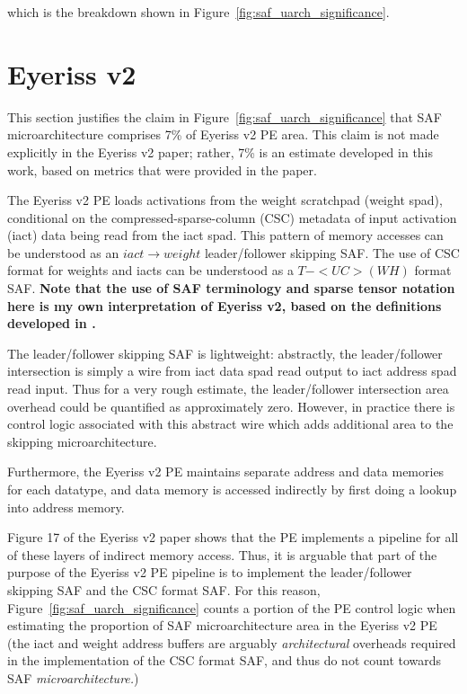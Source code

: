 which is the breakdown shown in Figure~\ref{fig:saf_uarch_significance}.

\section{Eyeriss v2\cite{eyerissv2}}

This section justifies the claim in Figure~\ref{fig:saf_uarch_significance} that SAF microarchitecture comprises 7\% of Eyeriss v2 PE area. This claim is not made explicitly in the Eyeriss v2 paper\cite{eyerissv2}; rather, 7\% is an estimate developed in this work, based on metrics that were provided in the paper.

The Eyeriss v2 PE loads activations from the weight scratchpad (weight spad), conditional on the compressed-sparse-column (CSC) metadata of input activation (iact) data being read from the iact spad\cite{eyerissv2}. This pattern of memory accesses can be understood as an $iact \rightarrow weight$ leader/follower skipping SAF. The use of CSC format for weights and iacts can be understood as a $T-<UC>(WH)$ format SAF. \textbf{Note that the use of SAF terminology and sparse tensor notation here is my own interpretation of Eyeriss v2, based on the definitions developed in \cite{sparseloop}\cite{szebook}.}

The leader/follower skipping SAF is lightweight: abstractly, the leader/follower intersection is simply a wire from iact data spad read output to iact address spad read input. Thus for a very rough estimate, the leader/follower intersection area overhead could be quantified as approximately zero. However, in practice there is control logic associated with this abstract wire which adds additional area to the skipping microarchitecture. 

Furthermore, the Eyeriss v2 PE maintains separate address and data memories for each datatype, and data memory is accessed indirectly by first doing a lookup into address memory\cite{eyerissv2}. 

Figure 17 of the Eyeriss v2 paper shows that the PE implements a pipeline for all of these layers of indirect memory access\cite{eyerissv2}. Thus, it is arguable that part of the purpose of the Eyeriss v2 PE pipeline is to implement the leader/follower skipping SAF and the CSC format SAF. For this reason, Figure~\ref{fig:saf_uarch_significance} counts a portion of the PE control logic when estimating the proportion of SAF microarchitecture area in the Eyeriss v2 PE (the iact and weight address buffers are arguably \textit{architectural} overheads required in the implementation of the CSC format SAF, and thus do not count towards SAF \textit{microarchitecture.})



